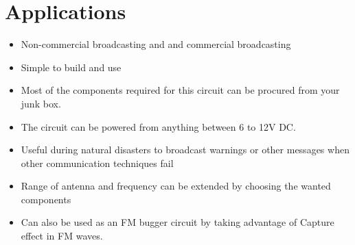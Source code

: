 

\chapter{Applications}

\begin{itemize}
	\item Non-commercial broadcasting and
	and commercial broadcasting
	\item Simple to build and use
	\item Most of the components required for this circuit can be procured from your junk box.
	\item The circuit can be powered from anything between 6 to 12V DC.
	\item Useful during natural disasters to broadcast warnings or other messages when other communication techniques fail
	\item Range of antenna and frequency can be extended by choosing the wanted components
	\item Can also be used as an FM bugger circuit by taking advantage of Capture effect in FM waves.				
\end{itemize}
%
%
%
